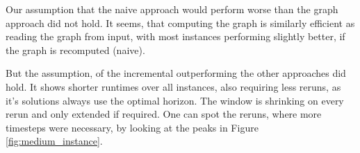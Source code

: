 Our assumption that the naive approach would perform worse than the graph approach did not hold. It seems, that computing the graph is similarly efficient as reading the graph from input, with most instances performing slightly better, if the graph is recomputed (naive).

But the assumption, of the incremental outperforming the other approaches did hold. It shows shorter runtimes over all instances, also requiring less reruns, as it's solutions always use the optimal horizon. The window is shrinking on every rerun and only extended if required. One can spot the reruns, where more timesteps were necessary, by looking at the peaks in Figure \ref{fig:medium_instance}.
